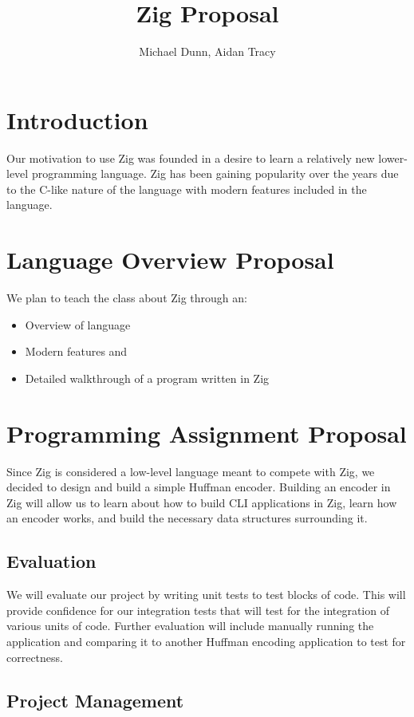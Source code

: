 \documentclass{article}
\title{Zig Proposal}
\author{Michael Dunn, Aidan Tracy}
\begin{document}
\maketitle

\section{Introduction}

Our motivation to use Zig was founded in a desire to learn a relatively new lower-level programming language. Zig has been gaining popularity over the years due to the C-like nature of the language with modern features included in the language.

\section{Language Overview Proposal}

We plan to teach the class about Zig through an:
\begin{itemize}
    \item Overview of language
    \item Modern features and
    \item Detailed walkthrough of a program written in Zig
\end{itemize}

\section{Programming Assignment Proposal}
Since Zig is considered a low-level language meant to compete with Zig, we decided to design and build a simple Huffman encoder. Building an encoder in Zig will allow us to learn about how to build CLI applications in Zig, learn how an encoder works, and build the necessary data structures surrounding it.

\subsection{Evaluation}
We will evaluate our project by writing unit tests to test blocks of code. This will provide confidence for our integration tests that will test for the integration of various units of code. Further evaluation will include manually running the application and comparing it to another Huffman encoding application to test for correctness.

\subsection{Project Management}
\end{document}
